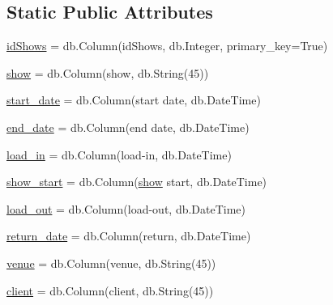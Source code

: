 \subsection*{Static Public Attributes}
\begin{DoxyCompactItemize}
\item 
\hyperlink{class_web_content_1_1classes_1_1_shows_a9ed1265f6e8a1078de474691f846f793}{id\+Shows} = db.\+Column(\textquotesingle{}id\+Shows\textquotesingle{}, db.\+Integer, primary\+\_\+key=True)
\item 
\hyperlink{class_web_content_1_1classes_1_1_shows_aec2efee9bcdad6b3a4732d6327d7f25c}{show} = db.\+Column(\textquotesingle{}show\textquotesingle{}, db.\+String(45))
\item 
\hyperlink{class_web_content_1_1classes_1_1_shows_a6c17ca935d1ab7bce12c2ad5a55bfd0e}{start\+\_\+date} = db.\+Column(\textquotesingle{}start date\textquotesingle{}, db.\+Date\+Time)
\item 
\hyperlink{class_web_content_1_1classes_1_1_shows_a8e22ab3d1b30b350f3464bcd61b3ab8a}{end\+\_\+date} = db.\+Column(\textquotesingle{}end date\textquotesingle{}, db.\+Date\+Time)
\item 
\hyperlink{class_web_content_1_1classes_1_1_shows_ae41baa66efcab2e7d85ceae9e3a7412e}{load\+\_\+in} = db.\+Column(\textquotesingle{}load-\/in\textquotesingle{}, db.\+Date\+Time)
\item 
\hyperlink{class_web_content_1_1classes_1_1_shows_ad70665816e2050b3176e90e95655f3fb}{show\+\_\+start} = db.\+Column(\textquotesingle{}\hyperlink{class_web_content_1_1classes_1_1_shows_aec2efee9bcdad6b3a4732d6327d7f25c}{show} start\textquotesingle{}, db.\+Date\+Time)
\item 
\hyperlink{class_web_content_1_1classes_1_1_shows_a3e62a0e6c2317a0250bfb3367294f068}{load\+\_\+out} = db.\+Column(\textquotesingle{}load-\/out\textquotesingle{}, db.\+Date\+Time)
\item 
\hyperlink{class_web_content_1_1classes_1_1_shows_aee5eee42b3d279a14f401c113d79083c}{return\+\_\+date} = db.\+Column(\textquotesingle{}return\textquotesingle{}, db.\+Date\+Time)
\item 
\hyperlink{class_web_content_1_1classes_1_1_shows_ac931bd921ecb35a0e221ff9133162d2c}{venue} = db.\+Column(\textquotesingle{}venue\textquotesingle{}, db.\+String(45))
\item 
\hyperlink{class_web_content_1_1classes_1_1_shows_ad95c8895e4633584f7da017e2b79f45d}{client} = db.\+Column(\textquotesingle{}client\textquotesingle{}, db.\+String(45))
\item 

\end{DoxyCompactItemize}

